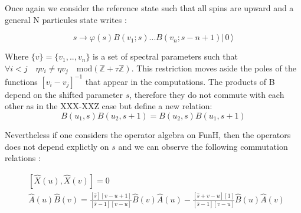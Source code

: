 \documentclass[12pt]{article}
\newcommand{\ket}[1]{|\,#1\,\rangle}
\begin{document}


 


Once again we consider the reference state such that all spins are upward and  
a general N particules state writes :

\begin{equation}
s\to\varphi(s) B(v_{1};s)...B(v_n;s-n+1)\ket{0}
\end{equation}


Where $\{v\}=\{v_{1},..,v_{n}\}$ is a set of spectral parameters such that $\forall i<j \quad \eta v_i\neq \eta v_j \quad
\text{mod}(\mathbb{Z}+\tau\mathbb{Z})$. This restriction moves aside the poles of the functions $[v_i-v_j]^{-1}$ that appear in the computations. The products of B depend on the shifted parameter $s$, therefore they do not commute with each other as in the XXX-XXZ case but define a new relation: 
\begin{equation}
B(u_1,s)B(u_2,s+1)=B(u_2,s)B(u_1,s+1)
\end{equation}

Nevertheless if one considers the operator algebra on FunH, then the operators does not depend explictly on $s$ and we can observe the following commutation relations : %

\begin{align*}
&[\widehat{X}(u),\widehat{X}(v)]=0\\
&\widehat{A}(u)\widehat{B}(v)=\frac{[\widehat{s}][v-u+1]}{[\widehat{s}-1][v-u]}\widehat{B}(v)\widehat{A}(u)-\frac{[\widehat{s}+v-u][1]}{[\widehat{s}-1][v-u]}\widehat{B}(u)\widehat{A}(v)
\end{align*}
\end{document}

